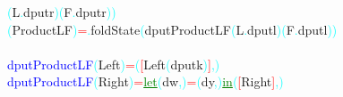 \textcolor{cyan}{(}{\rm{}L}\textcolor{cyan}{.}{\rm{}dputr}\textcolor{cyan}{)}\hsspace \textcolor{cyan}{(}{\rm{}F}\textcolor{cyan}{.}{\rm{}dputr}\textcolor{cyan}{)}\textcolor{cyan}{)}\\\hsspace \hsspace \hsspace \textcolor{cyan}{(}{\rm{}ProductLF}\textcolor{cyan}{)}\hsspace \textcolor{red}{=}\textcolor{cyan}{.}{\rm{}foldState}\hsspace \textcolor{cyan}{(}{\rm{}dputProductLF}\hsspace \textcolor{cyan}{(}{\rm{}L}\textcolor{cyan}{.}{\rm{}dputl}\textcolor{cyan}{)}\hsspace \textcolor{cyan}{(}{\rm{}F}\textcolor{cyan}{.}{\rm{}dputl}\textcolor{cyan}{)}\textcolor{cyan}{)}\\\\\textcolor{blue}{dputProductLF}\hsspace \textcolor{cyan}{(}{\rm{}Left}\hsspace {}\textcolor{cyan}{)}\hsspace \textcolor{red}{=}\hsspace \textcolor{cyan}{(}\textcolor{red}{[}{\rm{}Left}\hsspace \textcolor{cyan}{(}{\rm{}dputk}\textcolor{cyan}{)}\textcolor{red}{]}\textcolor{cyan}{,}\textcolor{cyan}{)}\\\textcolor{blue}{dputProductLF}\hsspace \textcolor{cyan}{(}{\rm{}Right}\textcolor{cyan}{)}\hsspace \textcolor{red}{=}\hsspace \textcolor{green}{\underline{let}}\hsspace \textcolor{cyan}{(}{\rm{}dw}\textcolor{cyan}{,}\textcolor{cyan}{)}\hsspace \textcolor{red}{=}\hsspace \textcolor{cyan}{(}{\rm{}dy}\textcolor{cyan}{,}\textcolor{cyan}{)}\hsspace \textcolor{green}{\underline{in}}\hsspace \textcolor{cyan}{(}\textcolor{red}{[}{\rm{}Right}\textcolor{red}{]}\textcolor{cyan}{,}\textcolor{cyan}{)}\\
